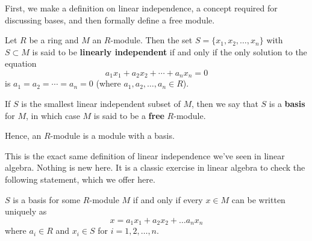 First, we make a definition on linear independence, a concept
required for discussing bases, and then formally define a free module.

\begin{definition}
    Let $R$ be a ring and $M$ an $R$-module. Then the set $S = \{x_1,
    x_2, \dots, x_n\}$ with $S \subset M$ is said to be
    \textbf{linearly independent} if and only if the only solution
    to the equation 
    \[
        a_1x_1 + a_2x_2 + \cdots + a_nx_n = 0
    \]
    is $a_1 = a_2 = \cdots = a_n = 0$ (where $a_1, a_2, \dots,
    a_n \in R$). 
    
    If $S$ is the smallest linear independent subset
    of $M$, then we say that $S$ is a \textbf{basis} for $M$, in
    which case $M$ is said to be a \textbf{free} $R$-module.
\end{definition}
Hence, an $R$-module is a module with a basis.

This is the exact same definition of linear independence we've
seen in linear algebra. 
Nothing is new here. It is a classic exercise in linear algebra to
check the following statement, which we offer here.

\begin{proposition}
    $S$ is a basis for some $R$-module $M$ if and only if every $x
    \in M$ can be written uniquely as 
    \[
        x = a_1x_1 + a_2x_2 + \dots a_nx_n
    \]
    where $a_i \in R$ and $x_i \in S$ for $i = 1,2, \dots, n$.
\end{proposition}

